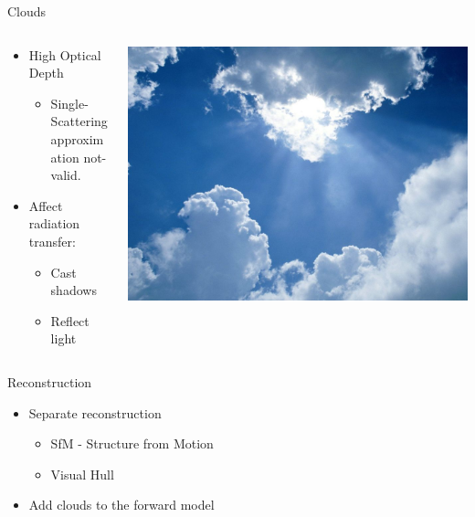 \documentclass[compress,red,12pt]{beamer}
\begin{document}
\begin{frame}{Clouds}
  \begin{columns}[T]
    \begin{column}{.6\textwidth}
      \begin{itemize}
      \item High Optical Depth
        \begin{itemize}
        \item Single-Scattering approximation not-valid.
        \end{itemize}
      \item Affect radiation transfer:
        \begin{itemize}
        \item Cast shadows
        \item Reflect light
        \end{itemize}
      \end{itemize}
    \end{column}
    \begin{column}{.4\textwidth}
      \includegraphics[height=0.40\textheight]{clouds.jpg}
    \end{column}
  \end{columns}
\end{frame}


\begin{frame}{Reconstruction}

  \begin{itemize}
  \item Separate reconstruction
    \begin{itemize}
    \item SfM - Structure from Motion 
    \item Visual Hull
    \end{itemize}
  \item Add clouds to the forward model
  \end{itemize}

\end{frame}
\end{document}
